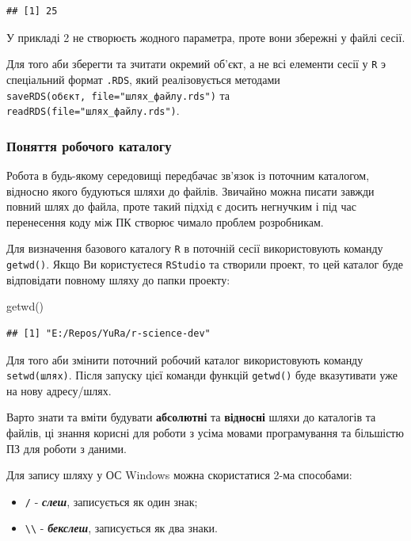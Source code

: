 \documentclass[
]{book}
\newenvironment{Shaded}{\begin{snugshade}}{\end{snugshade}}
\newcommand{\FunctionTok}[1]{\textcolor[rgb]{0.00,0.00,0.00}{#1}}
\newcommand{\NormalTok}[1]{#1}
\providecommand{\tightlist}{%
  \setlength{\itemsep}{0pt}\setlength{\parskip}{0pt}}
\begin{document}
\begin{verbatim}
## [1] 25
\end{verbatim}

У прикладі 2 не створюєть жодного параметра, проте вони збережні у файлі сесії.

Для того аби зберегти та зчитати окремий об'єкт, а не всі елементи сесії у \texttt{R} э спеціальний формат \texttt{.RDS}, який реалізовується методами \texttt{saveRDS(об\textquotesingle{}єкт,\ file="шлях\_файлу.rds")} та \texttt{readRDS(file="шлях\_файлу.rds")}.

\hypertarget{chapter1314}{%
\subsubsection{Поняття робочого каталогу}\label{chapter1314}}

Робота в будь-якому середовищі передбачає зв'язок із поточним каталогом, відносно якого будуються шляхи до файлів. Звичайно можна писати завжди повний шлях до файла, проте такий підхід є досить негнучким і під час перенесення коду між ПК створює чимало проблем розробникам.

Для визначення базового каталогу \texttt{R} в поточній сесії використовують команду \texttt{getwd()}. Якщо Ви користуєтеся \texttt{RStudio} та створили проект, то цей каталог буде відповідати повному шляху до папки проекту:

\begin{Shaded}
\begin{Highlighting}[]
\FunctionTok{getwd}\NormalTok{()}
\end{Highlighting}
\end{Shaded}

\begin{verbatim}
## [1] "E:/Repos/YuRa/r-science-dev"
\end{verbatim}

Для того аби змінити поточний робочий каталог використовують команду \texttt{setwd(шлях)}. Після запуску цієї команди функцій \texttt{getwd()} буде вказутивати уже на нову адресу/шлях.

Варто знати та вміти будувати \textbf{абсолютні} та \textbf{відносні} шляхи до каталогів та файлів, ці знання корисні для роботи з усіма мовами програмування та більшістю ПЗ для роботи з даними.

Для запису шляху у ОС Windows можна скористатися 2-ма способами:

\begin{itemize}
\tightlist
\item
  \texttt{/} - \textbf{\emph{слеш}}, записується як один знак;
\item
  \texttt{\textbackslash{}\textbackslash{}} - \textbf{\emph{бекслеш}}, записується як два знаки.
\end{itemize}
\end{document}
